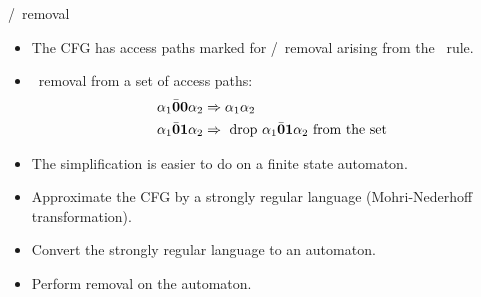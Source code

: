\documentclass[xcolor=x11names,compress,mathserif]{beamer}
\renewcommand{\(}{\begin{columns}}
\renewcommand{\)}{\end{columns}}
\newcommand{\<}[1]{\begin{column}{#1}}
\renewcommand{\>}{\end{column}}
\begin{document}
\begin{frame}{\acar/\acdr\  removal}



\begin{itemize}
\item<1-> The CFG has access paths marked for \acar/\acdr\  removal
  arising from the \CONS\  rule.
\item<2-> \acar\   removal from a set of access paths:
\begin{align*}
\alpha_1\bar{\mathbf{0}}\mathbf{0}\alpha_2 &\Rightarrow
  \alpha_1\alpha_2\\
\alpha_1\bar{\mathbf{0}} \mathbf{1}\alpha_2 &\Rightarrow
  \mbox{ drop $\alpha_1\bar{\mathbf{0}} \mathbf{1} \alpha_2$ from the set}
\end{align*}
\item<3->The simplification is easier to do on a finite state automaton.
\item<4-> Approximate the CFG by a strongly regular language
  (Mohri-Nederhoff transformation).
\item<5-> Convert the strongly regular language to an
  automaton. 
\item<6-> Perform removal on the automaton.
\end{itemize}

\end{frame}
\end{document}
